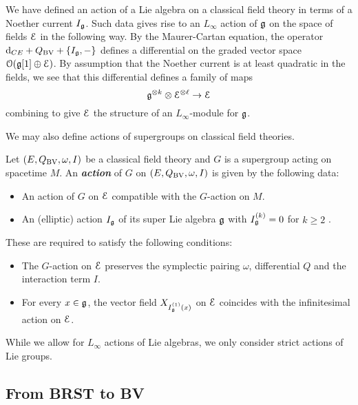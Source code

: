 \documentclass[10pt, oneside]{article}
\newcommand{\defterm}[1]{\textbf{\emph{#1}}}
\begin{document}
\begin{rmk}
We have defined an action of a Lie algebra on a classical field theory in terms of a Noether current $I_\mathfrak g$.
Such data gives rise to an $L_\infty$ action of $\mathfrak g$ on the space of fields $\mathcal E$ in the following way.
By the Maurer-Cartan equation, the operator ${\rm d}_{CE} + Q_{\mathrm{BV}} + \{I_\mathfrak g, -\}$ 
defines a differential on the graded vector space $\mathcal O(\mathfrak g[1] \oplus \mathcal E)$. 
By assumption that the Noether current is at least quadratic in the fields, we see that this differential defines a family of maps
\[
\mathfrak g^{\otimes k} \otimes \mathcal E^{\otimes \ell} \to \mathcal E
\]
combining to give $\mathcal E$ the structure of an $L_\infty$-module for $\mathfrak g$.
\end{rmk}

We may also define actions of supergroups on classical field theories.

\begin{definition}
\label{group_action_def}
Let $(E, Q_{\mathrm{BV}}, \omega, I)$ be a classical field theory and $G$ is a supergroup acting on spacetime $M$. An \defterm{action} of $G$ on $(E, Q_{\mathrm{BV}}, \omega, I)$ is given by the following data:
\begin{itemize}
\item An action of $G$ on $\mathcal E$ compatible with the $G$-action on $M$.

\item An (elliptic) action $I_\mathfrak g$ of its super Lie algebra $\mathfrak g$ with $I^{(k)}_\mathfrak g = 0$ for $k\geq 2$  .
\end{itemize}
These are required to satisfy the following conditions:
\begin{itemize}
\item The $G$-action on $\mathcal E$ preserves the symplectic pairing $\omega$, differential $Q$ and the interaction term $I$.

\item For every $x\in\mathfrak g$, the vector field $X_{{I^{(1)}_\mathfrak g}(x)}$ on $\mathcal E$ coincides with the infinitesimal action on $\mathcal E$.
\end{itemize}
\end{definition}

\begin{remark}
While we allow for $L_\infty$ actions of Lie algebras, we only consider strict actions of Lie groups.
\end{remark}

\subsection{From BRST to BV}
\end{document}
